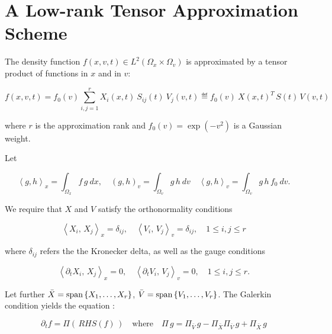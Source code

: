 
\section{A Low-rank Tensor Approximation Scheme}\label{sec:lowrank}

The density function $f(x, v, t) \in L^2 (\Omega_x \times \Omega_v)$ is approximated by a 
tensor product of functions in $x$ and in $v$:

\begin{equation}
    f(x, v, t) = f_0 (v) \sum_{i, j = 1}^{r} X_i (x, t)\ S_{i j} (t)\ V_j (v, t)
    \eqdef f_0 (v)\ X (x, t)^T \,S (t) \,V (v, t)
\end{equation}

where $r$ is the approximation rank and $f_0 (v) = \exp ( - v^2 )$ is a Gaussian weight. 

Let 

\begin{equation}
    \left\langle g, h \right\rangle_x = \int_{\Omega_x} f\,g\ dx, \quad 
    (g, h)_v = \int_{\Omega_v} g\,h\ dv \quad 
    \left\langle g, h \right\rangle_v = \int_{\Omega_v} g\, h\, f_0\ dv . 
\end{equation}

We require that $X$ and $V$ satisfy the orthonormality conditions 

\begin{equation}\label{eq:orthonormal}
    \left\langle X_i,\, X_j \right\rangle_x = \delta_{i j}, \quad 
    \left\langle V_i,\, V_j \right\rangle_v = \delta_{i j}, \quad 
    1 \leq i, j \leq r 
\end{equation}

where $\delta_{i j}$ refers the the Kronecker delta, as well as the gauge conditions 

\begin{equation}\label{eq:gauge}
    \left\langle \partial_t X_i,\, X_j \right\rangle_x = 0, \quad 
    \left\langle \partial_t V_i,\, V_j \right\rangle_v = 0, \quad 
    1 \leq i, j \leq r . 
\end{equation}

Let further $\bar{X} = \text{span} \left\{ X_1, \ldots, X_r \right\}$, 
$\bar{V} = \text{span} \left\{ V_1, \ldots, V_r \right\}$. The Galerkin condition yields the 
equation \cite{einkemmer2018}:

\begin{equation}\label{eq:galerkin}
    \partial_t f = \Pi \left(\, RHS (f) \,\right) 
    \quad \text{where} \quad 
    \Pi\, g = \Pi_{\bar{V}}\, g - \Pi_{\bar{X}}\Pi_{\bar{V}}\, g + \Pi_{\bar{X}}\, g
\end{equation}

